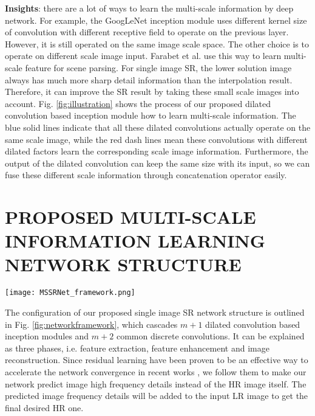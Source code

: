 \documentclass{article}
\begin{document}
\textbf{Insights}: there are a lot of ways to learn the multi-scale information by deep network. For example, the GoogLeNet inception module uses different kernel size of convolution with different receptive field to operate on the previous layer. However, it is still operated on the same image scale space. The other choice is to operate on different scale image input. Farabet et al. \cite{ref15} use this way to learn multi-scale feature for scene parsing. For single image SR, the lower solution image always has much more sharp detail information than the interpolation result. Therefore, it can improve the SR result by taking these small scale images into account. Fig. \ref{fig:illustration} shows the process of our proposed dilated convolution based inception module how to learn multi-scale information. The blue solid lines indicate that all these dilated convolutions actually operate on the same scale image, while the red dash lines mean these convolutions with different dilated factors learn the corresponding scale image information. Furthermore, the output of the dilated convolution can keep the same size with its input, so we can fuse these different scale information through concatenation operator easily.

\section{PROPOSED MULTI-SCALE INFORMATION LEARNING NETWORK STRUCTURE}
\label{sec:proposed}

\begin{figure*}[htb]

\begin{minipage}[b]{1.0\linewidth}
  \centering
  \centerline{\texttt{[image: MSSRNet\_framework.png]}}
\end{minipage}
\vspace{-0.9cm}
\caption{The proposed single image super-resolution network structure with dilated convolution based multi-scale information learning inception module. It uses inception module, which contains different scale dilated convolution, to learn multi-scale information. Multiple inception modules cascade to constitute a deep network to predict high frequency detail information.}
\label{fig:networkframework}
\vspace{-0.4cm}
\end{figure*}

The configuration of our proposed single image SR network structure is outlined in Fig. \ref{fig:networkframework}, which cascades $m + 1$ dilated convolution based inception modules and $m + 2$ common discrete convolutions. It can be explained as three phases, i.e. feature extraction, feature enhancement and image reconstruction. Since residual learning have been proven to be an effective way to accelerate the network convergence in recent works \cite{ref9}, we follow them to make our network predict image high frequency details instead of the HR image itself. The predicted image frequency details will be added to the input LR image to get the final desired HR one.
\end{document}
